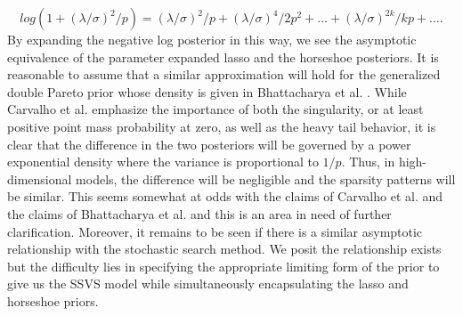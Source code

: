 \begin{equation}\label{eqn:taylor_log_one_plus_x}
log\left(1+(\lambda/\sigma)^2/p\right) = (\lambda/\sigma)^2/p + (\lambda/\sigma)^4/2p^2 + \dots+ (\lambda/\sigma)^{2k}/kp + \dots.
\end{equation}
By expanding the negative log posterior in this way, we see the asymptotic equivalence of the parameter expanded lasso and the horseshoe posteriors. It is reasonable to assume that a similar approximation will hold for the generalized double Pareto prior whose density is given in Bhattacharya et al. \cite{bhattacharya2012bayesian}. While Carvalho et al. \cite{carvalho2010horseshoe} emphasize the importance of both the singularity, or at least positive point mass probability at zero, as well as the heavy tail behavior, it is clear that the difference in the two posteriors will be governed by a power exponential density where the variance is proportional to $1/p$. Thus, in high-dimensional models, the difference will be negligible and the sparsity patterns will be similar. This seems somewhat at odds with the claims of Carvalho et al. and the claims of Bhattacharya et al. and this is an area in need of further clarification. Moreover, it remains to be seen if there is a similar asymptotic relationship with the stochastic search method. We posit the relationship exists but the difficulty lies in specifying the appropriate limiting form of the prior to give us the SSVS model while simultaneously encapsulating the lasso and horseshoe priors. 



 